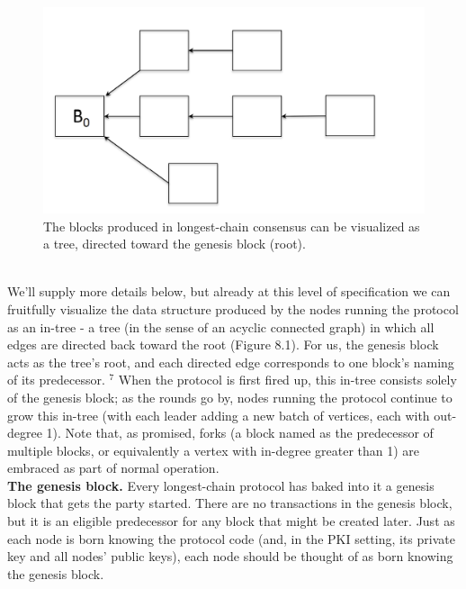 \begin{figure}[h]
    \centering
    \includegraphics[scale = 0.5]{figures/f22.png}
    \caption{The blocks produced in longest-chain consensus can be visualized as a tree, directed toward the genesis block (root).}
    \label{fig:mesh1}
\end{figure}\\
We'll supply more details below, but already at this level of specification we can fruitfully visualize the data structure produced by the nodes running the protocol as an in-tree - a tree (in the sense of an acyclic connected graph) in which all edges are directed back toward the root (Figure 8.1). For us, the genesis block acts as the tree's root, and each directed edge corresponds to one block's naming of its predecessor. ${ }^{7}$ When the protocol is first fired up, this in-tree consists solely of the genesis block; as the rounds go by, nodes running the protocol continue to grow this in-tree (with each leader adding a new batch of vertices, each with out-degree 1). Note that, as promised, forks (a block named as the predecessor of multiple blocks, or equivalently a vertex with in-degree greater than 1) are embraced as part of normal operation.\\

\noindent
\textbf{The genesis block.} Every longest-chain protocol has baked into it a genesis block that gets the party started. There are no transactions in the genesis block, but it is an eligible predecessor for any block that might be created later. Just as each node is born knowing the protocol code (and, in the PKI setting, its private key and all nodes' public keys), each node should be thought of as born knowing the genesis block.\\

